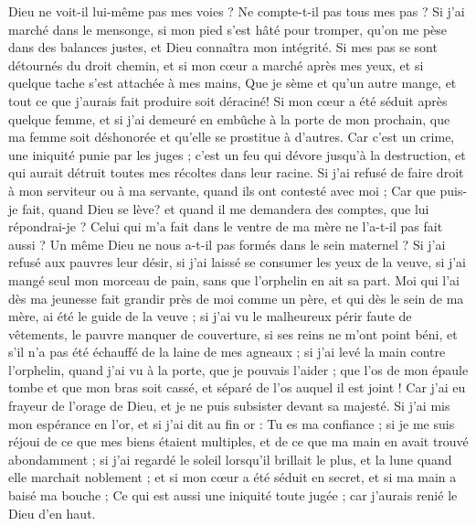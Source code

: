 \begin{multicols}{2}
{Dieu ne voit-il lui-même pas mes voies ? Ne compte-t-il pas tous mes pas ?
Si j'ai marché dans le mensonge, si mon pied s'est hâté pour tromper,
qu'on me pèse dans des balances justes, et Dieu connaîtra mon intégrité.
Si mes pas se sont détournés du droit chemin, et si mon cœur a marché après mes yeux, et si quelque tache s'est attachée à mes mains,
Que je sème et qu'un autre mange, et tout ce que j'aurais fait produire soit déraciné!
Si mon cœur a été séduit après quelque femme, et si j'ai demeuré en embûche à la porte de mon prochain,
que ma femme soit déshonorée et qu'elle se prostitue à d'autres.
Car c'est un crime, une iniquité punie par les juges ;
c'est un feu qui dévore jusqu'à la destruction, et qui aurait détruit toutes mes récoltes dans leur racine.
Si j'ai refusé de faire droit à mon serviteur ou à ma servante, quand ils ont contesté avec moi ;
Car que puis-je fait, quand Dieu se lève? et quand il me demandera des comptes, que lui répondrai-je ?
Celui qui m'a fait dans le ventre de ma mère ne l'a-t-il pas fait aussi ? Un même Dieu ne nous a-t-il pas formés dans le sein maternel ?
Si j'ai refusé aux pauvres leur désir, si j'ai laissé se consumer les yeux de la veuve,
si j'ai mangé seul mon morceau de pain, sans que l'orphelin en ait sa part.
Moi qui l'ai dès ma jeunesse fait grandir près de moi comme un père, et qui dès le sein de ma mère, ai été le guide de la veuve ;
si j'ai vu le malheureux périr faute de vêtements, le pauvre manquer de couverture,
si ses reins ne m'ont point béni, et s'il n'a pas été échauffé de la laine de mes agneaux ;
si j'ai levé la main contre l'orphelin, quand j'ai vu à la porte, que je pouvais l'aider ;
que l'os de mon épaule tombe et que mon bras soit cassé, et séparé de l'os auquel il est joint !
Car j'ai eu frayeur de l'orage de Dieu, et je ne puis subsister devant sa majesté. 
Si j'ai mis mon espérance en l'or, et si j'ai dit au fin or : Tu es ma confiance ;
si je me suis réjoui de ce que mes biens étaient multiples, et de ce que ma main en avait trouvé abondamment ;
si j'ai regardé le soleil lorsqu'il brillait le plus, et la lune quand elle marchait noblement ;
et si mon cœur a été séduit en secret, et si ma main a baisé ma bouche ; 
Ce qui est aussi une iniquité toute jugée ; car j'aurais renié le Dieu d'en haut.
}
\end{multicols}
